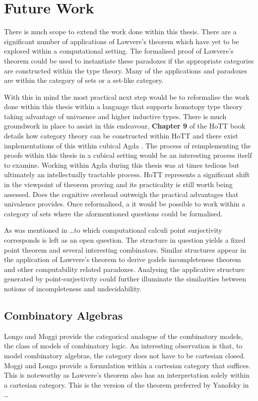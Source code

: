 \section{Future Work}
There is much scope to extend the work done within this thesis. There are a
significant number of applications of Lawvere's theorem which have yet to be
explored within a computational setting. The formalised proof of Lawvere's
theorem could be used to instantiate these paradoxes if the appropriate
categories are constructed within the type theory. Many of the applications and
paradoxes are within the category of sets or a set-like category.



With this in mind the most practical next step would be to reformalise the work
done within this thesis within a language that supports homotopy type theory
taking advantage of univaence and higher inductive types. There is much
groundwork in place to assist in this endeavour, \textbf{Chapter 9} of
the HoTT book details how category theory can be constructed within HoTT and
there exist implementations of this within cubical Agda . The
process of reimplementing the proofs within this thesis in a cubical setting
would be an interesting process itself to examine. Working within Agda during
this thesis was at times tedious but ultimately an intellectually tractable
process. HoTT represents a significant shift in the viewpoint of theorem proving
and its practicality is still worth being assessed. Does the cognitive overhead
outweigh the practical advantages that univalence provides. Once reformalised, a
it would be possible to work within a category of sets where the aformentioned
questions could be formalised.


As was mentioned in \ldots to which computational calculi point surjectivity
corresponds is left as an open question. The structure in question yields a
fixed point theorem and several interesting combinators. Similar structures
appear in the application of Lawvere's theorem to derive godels incompleteness
theorem and other computability related paradoxes. Analysing the applicative
structure generated by point-surjectivity could further illuminate the
similarities between notions of incompleteness and undecidability.

\subsection{Combinatory Algebras}
\label{section:combin}
Longo and Moggi provide the categorical analogue of the combinatory models, the
class of models of combinatory logic. An interesting observation is that, to
model combinatory algebras, the category does not have to be cartesian closed.
Moggi and Longo provide a formulation within a cartesian category that suffices.
This is noteworthy as Lawvere's theorem also has an interpretation solely within
a cartesian category. This is the version of the theorem preferred by Yanofsky
in \ldots
